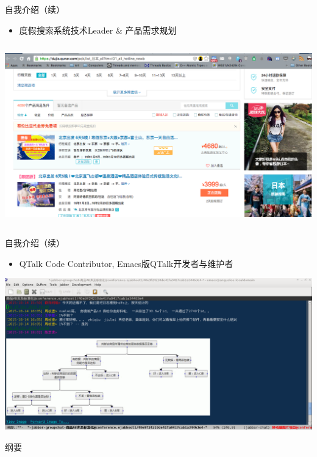 \documentclass{beamer}
\begin{document}
\begin{CJK}{UTF8}{gbsn}
\begin{frame}{自我介绍（续）}
  \begin{itemize}
  \item {度假搜索系统技术Leader \& 产品需求规划}
  \end{itemize}
  \vspace{3 mm}
  \begin{columns}
    \includegraphics[scale=0.15]{./images/pc-search-screenshot}
  \end{columns}
\end{frame}

\begin{frame}{自我介绍（续）}
  \begin{itemize}
  \item {QTalk Code Contributor, Emacs版QTalk开发者与维护者}
  \end{itemize}
  \begin{center}
    \includegraphics[scale=0.3]{./images/qtalk-emacs-screenshot}
  \end{center}
\end{frame}

\begin{frame}{纲要}
  \tableofcontents
\end{frame}


\end{CJK}
\end{document}
